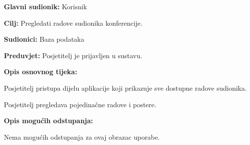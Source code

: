 					\noindent {}
					\begin{packed_item}
						
						\item \textbf{Glavni sudionik: }Korisnik
						\item  \textbf{Cilj:} Pregledati radove sudionika konferencije.
						\item  \textbf{Sudionici:} Baza podataka
						\item  \textbf{Preduvjet:} Posjetitelj je prijavljen u sustavu.
						\item  \textbf{Opis osnovnog tijeka:}
						
						\item[] \begin{packed_enum}
							
							\item Posjetitelj pristupa dijelu aplikacije koji prikazuje sve dostupne radove sudionika.
							\item Posjetitelj pregledava pojedinačne radove i postere.

						\end{packed_enum}
						
						\item  \textbf{Opis mogućih odstupanja:}
						
						\item[] \begin{packed_item}
							
							\item Nema mogućih odstupanja za ovaj obrazac uporabe.
							
						\end{packed_item}
					\end{packed_item}
					

